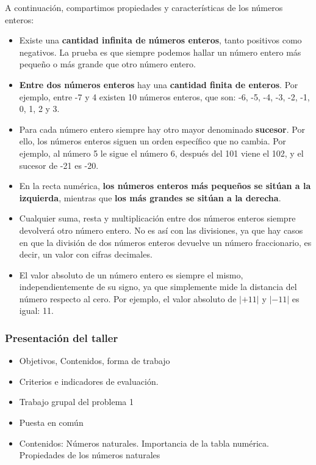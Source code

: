 \begin{center}
\begin{minipage}{0.8\linewidth}
		A continuación, compartimos propiedades y características de los números enteros:
		\begin{itemize}
			\item Existe una \textbf{cantidad infinita de números enteros}, tanto positivos como negativos. La prueba es que siempre podemos hallar un número entero más pequeño o más grande que otro número entero.
			\item \textbf{Entre dos números enteros} hay una \textbf{cantidad finita de enteros}. Por ejemplo, entre -7 y 4 existen 10 números enteros, que son: -6, -5, -4, -3, -2, -1, 0, 1, 2 y 3.
			\item Para cada número entero siempre hay otro mayor denominado \textbf{sucesor}. Por ello, los números enteros siguen un orden específico que no cambia. Por ejemplo, al número 5 le sigue el número 6, después del 101 viene el 102, y el sucesor de -21 es -20.
			\item En la recta numérica, \textbf{los números enteros más pequeños se sitúan a la izquierda}, mientras que \textbf{los más grandes se sitúan a la derecha}.
			\item Cualquier suma, resta y multiplicación entre dos números enteros siempre devolverá otro número entero. No es así con las divisiones, ya que hay casos en que la división de dos números enteros devuelve un número fraccionario, es decir, un valor con cifras decimales.
			\item El valor absoluto de un número entero es siempre el mismo, independientemente de su signo, ya que simplemente mide la distancia del número respecto al cero. Por ejemplo, el valor absoluto de $|+11|$ y $|-11|$ es igual: 11.
		\end{itemize}
	\end{minipage}
\end{center}

\bigskip

\subsubsection{Presentación del taller}

\begin{itemize}
	\item Objetivos, Contenidos, forma de trabajo
	\item Criterios e indicadores de evaluación.
	\item Trabajo grupal del problema 1
	\item Puesta en común
	\item Contenidos: Números naturales. Importancia de la tabla numérica. Propiedades de los números naturales
\end{itemize}

